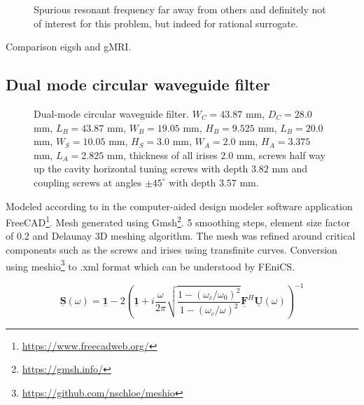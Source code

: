 \documentclass[11pt, a4paper]{article}
\begin{document}
\begin{figure}[ht]
    \centering
    
    \caption{Spurious resonant frequency far away from others and definitely 
    not of interest for this problem, but indeed for rational surrogate.}
    \label{fig:imperfect-conductor-eigfreqs}
\end{figure}

\begin{table}[ht]
    \caption{Comparison eigsh and gMRI.}
    \label{tab:imperfect-conductor-comparison}
    
\end{table}

\subsection{Dual mode circular waveguide filter}
\label{subsec:examples-dmcwf}


\begin{figure}[h]
    \centering
    
    \caption{Dual-mode circular waveguide filter. \cite{DMCWF-Dimensions}
    $W_C=43.87$ mm, $D_C=28.0$ mm, $L_B=43.87$ mm, $W_B=19.05$ mm, $H_B=9.525$ mm,
    $L_B=20.0$ mm, $W_S=10.05$ mm, $H_S=3.0$ mm, $W_A=2.0$ mm, $H_A=3.375$ mm,
    $L_A=2.825$ mm, thickness of all irises $2.0$ mm, screws half way up
    the cavity horizontal tuning screws with depth $3.82$ mm
    and coupling screws at angles $\pm 45^{\circ}$ with depth $3.57$ mm.}
    \label{fig:DMCWF}
\end{figure}

Modeled according to \cite{DMCWF-Dimensions} in the computer-aided design 
modeler software application FreeCAD\footnote{\url{https://www.freecadweb.org/}}.
Mesh generated using Gmsh\footnote{\url{https://gmsh.info/}}. 5 smoothing
steps, element size factor of 0.2 and Delaunay 3D meshing algorithm.
The mesh was refined around critical components such as the screws and irises
using transfinite curves.
Conversion using meshio\footnote{\url{https://github.com/nschloe/meshio}} to .xml
format which can be understood by FEniCS.

\cite{shortMRI}
\begin{equation}
    \mathbf{\underline{S}}(\omega) = \mathbf{\underline{1}}
    - 2\left( \mathbf{\underline{1}} + i \frac{\omega}{2\pi}
    \sqrt{\frac{1 - (\omega_c / \omega_0)^2}{1 - (\omega_c / \omega)^2}} 
    \mathbf{\underline{F}}^H \mathbf{\underline{U}}(\omega) \right)^{-1}
\end{equation}
\end{document}
